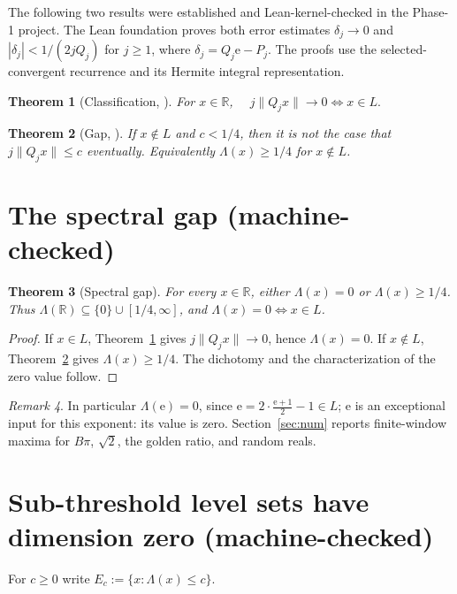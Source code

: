 \documentclass[11pt]{article}
\newtheorem{theorem}{Theorem}
\theoremstyle{definition}
\theoremstyle{remark}
\newtheorem{remark}[theorem]{Remark}
\newcommand{\R}{\mathbb{R}}
\newcommand{\ee}{\mathrm{e}}
\newcommand{\Lam}{\Lambda}
\begin{document}
The following two results were established and Lean-kernel-checked in the
Phase-1 project. The Lean foundation proves both error estimates
$\delta_j\to0$ and $|\delta_j|<1/(2jQ_j)$ for $j\ge1$, where
$\delta_j=Q_j\ee-P_j$. The proofs use the selected-convergent
recurrence and its Hermite integral representation.

\begin{theorem}[Classification, {\cite[Thm.~2]{Phase1}}]\label{thm:class}
For $x\in\R$, $\quad j\|Q_jx\|\to0\iff x\in L.$
\end{theorem}

\begin{theorem}[Gap, {\cite[Cor.~3]{Phase1}}]\label{thm:gap}
If $x\notin L$ and $c<1/4$, then it is \emph{not} the case that
$j\|Q_jx\|\le c$ eventually. Equivalently $\Lam(x)\ge1/4$ for $x\notin L$.
\end{theorem}

\section{The spectral gap (machine-checked)}

\begin{theorem}[Spectral gap]\label{thm:spectral}
For every $x\in\R$, either $\Lam(x)=0$ or $\Lam(x)\ge1/4$. Thus
$\Lam(\R)\subseteq\{0\}\cup[1/4,\infty]$, and $\Lam(x)=0\iff x\in L$.
\end{theorem}

\begin{proof}
If $x\in L$, Theorem~\ref{thm:class} gives $j\|Q_jx\|\to0$, hence $\Lam(x)=0$.
If $x\notin L$, Theorem~\ref{thm:gap} gives $\Lam(x)\ge1/4$. The dichotomy and
the characterization of the zero value follow.
\end{proof}

\begin{remark}
In particular $\Lam(\ee)=0$, since $\ee=2\cdot\frac{\ee+1}{2}-1\in L$; $\ee$ is
an exceptional input for this exponent: its value is zero.
Section~\ref{sec:num} reports finite-window maxima for $B\pi$, $\sqrt2$,
the golden ratio, and random reals.
\end{remark}

\section{Sub-threshold level sets have dimension zero (machine-checked)}

For $c\ge0$ write $E_c:=\{x:\Lam(x)\le c\}$.
\end{document}
